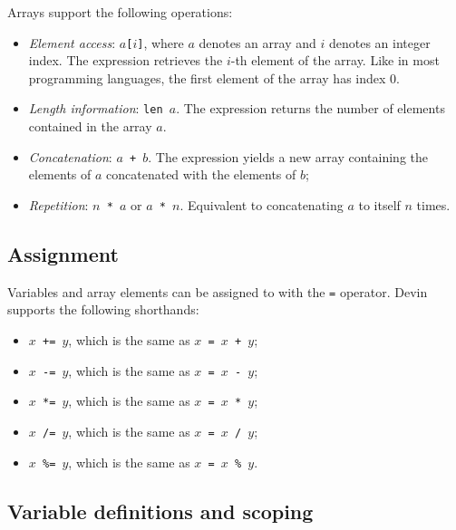 \documentclass[11pt, american, draft]{PhdThesis}
\begin{document}
  Arrays support the following operations:

  \begin{itemize}[noitemsep,topsep=0pt]
    \item \emph{Element access}: \mbox{\texttt{$a$[$i$]}}, where $a$ denotes an array and $i$
    denotes an integer index. The expression retrieves the $i$-th element of the array. Like in most
    programming languages, the first element of the array has index $0$.

    \item \emph{Length information}: \mbox{\texttt{len $a$}}. The expression returns the number of
    elements contained in the array $a$.

    \item \emph{Concatenation}: \mbox{\texttt{$a$ + $b$}}. The expression yields a new array
    containing the elements of $a$ concatenated with the elements of $b$;

    \item \emph{Repetition}: \mbox{\texttt{$n$ * $a$}} or \mbox{\texttt{$a$ * $n$}}. Equivalent to
    concatenating $a$ to itself $n$ times.
  \end{itemize}

  \subsection{Assignment}

  Variables and array elements can be assigned to with the \verb$=$ operator. Devin supports the
  following shorthands:

  \begin{itemize}[noitemsep,topsep=0pt]
    \item \mbox{\texttt{$x$ += $y$}}, which is the same as \mbox{\texttt{$x$ = $x$ + $y$}};
    \item \mbox{\texttt{$x$ -= $y$}}, which is the same as \mbox{\texttt{$x$ = $x$ - $y$}};
    \item \mbox{\texttt{$x$ *= $y$}}, which is the same as \mbox{\texttt{$x$ = $x$ * $y$}};
    \item \mbox{\texttt{$x$ /= $y$}}, which is the same as \mbox{\texttt{$x$ = $x$ / $y$}};
    \item \mbox{\texttt{$x$ \%= $y$}}, which is the same as \mbox{\texttt{$x$ = $x$ \% $y$}}.
  \end{itemize}

  \subsection{Variable definitions and scoping}
\end{document}
